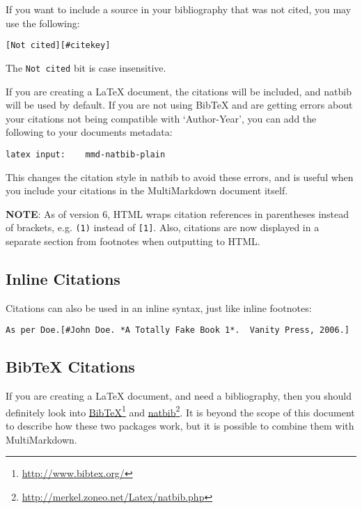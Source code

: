 If you want to include a source in your bibliography that was not cited, you may use the following:

\begin{verbatim}
[Not cited][#citekey]
\end{verbatim}

The \texttt{Not cited} bit is case insensitive.

If you are creating a LaTeX document, the citations will be included, and natbib will be used by default. If you are not using BibTeX and are getting errors about your citations not being compatible with `Author-Year', you can add the following to your documents metadata:

\begin{verbatim}
latex input:	mmd-natbib-plain
\end{verbatim}

This changes the citation style in natbib to avoid these errors, and is useful when you include your citations in the MultiMarkdown document itself.

\textbf{NOTE}: As of version 6, HTML wraps citation references in parentheses instead of brackets, e.g. \texttt{(1)} instead of \texttt{[1]}. Also, citations are now displayed in a separate section from footnotes when outputting to HTML.

\subsection{Inline Citations}
\label{inlinecitations}

Citations can also be used in an inline syntax, just like inline footnotes:

\begin{verbatim}
As per Doe.[#John Doe. *A Totally Fake Book 1*.  Vanity Press, 2006.]
\end{verbatim}

\subsection{BibTeX Citations}
\label{bibtexcitations}

If you are creating a LaTeX document, and need a bibliography, then you should definitely look into \href{http://www.bibtex.org/}{BibTeX}\footnote{\href{http://www.bibtex.org/}{http:\slash \slash www.bibtex.org\slash }} and \href{http://merkel.zoneo.net/Latex/natbib.php}{natbib}\footnote{\href{http://merkel.zoneo.net/Latex/natbib.php}{http:\slash \slash merkel.zoneo.net\slash Latex\slash natbib.php}}. It is beyond the scope of this document to describe how these two packages work, but it is possible to combine them with MultiMarkdown.


